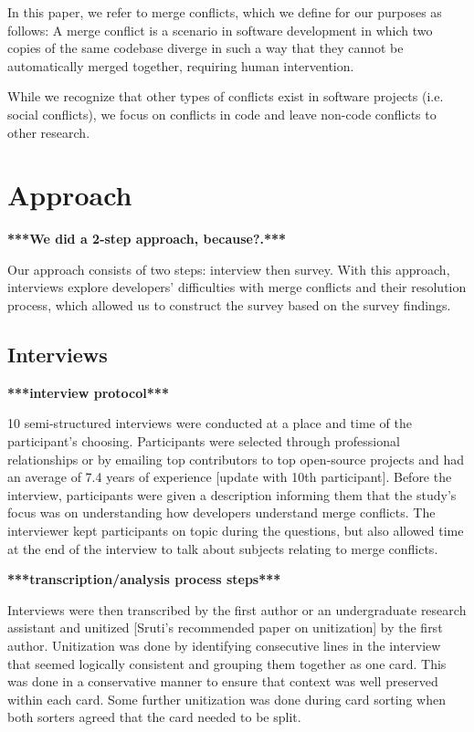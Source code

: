 \documentclass[conference]{IEEEtran}
\begin{document}
In this paper, we refer to merge conflicts, which we define for our purposes as follows:
A merge conflict is a scenario in software development in which two copies of the same codebase diverge in such a way that they cannot be automatically merged together, requiring human intervention. 

While we recognize that other types of conflicts exist in software projects (i.e. social conflicts), we focus on conflicts in code and leave non-code conflicts to other research.

\section{Approach}
\textbf{***We did a 2-step approach, because?.***}

Our approach consists of two steps: interview then survey. With this approach, interviews explore developers' difficulties with merge conflicts and their resolution process, which allowed us to construct the survey based on the survey findings.

\subsection{Interviews}
\textbf{***interview protocol***}

10 semi-structured interviews were conducted at a place and time of the participant's choosing. Participants were selected through professional relationships or by emailing top contributors to top open-source projects and had an average of 7.4 years of experience [update with 10th participant]. Before the interview, participants were given a description informing them that the study's focus was on understanding how developers understand merge conflicts. The interviewer kept participants on topic during the questions, but also allowed time at the end of the interview to talk about subjects relating to merge conflicts. 

\textbf{***transcription/analysis process steps***}

Interviews were then transcribed by the first author or an undergraduate research assistant and unitized [Sruti's recommended paper on unitization] by the first author. Unitization was done by identifying consecutive lines in the interview that seemed logically consistent and grouping them together as one card. This was done in a conservative manner to ensure that context was well preserved within each card. Some further unitization was done during card sorting when both sorters agreed that the card needed to be split.
\end{document}
